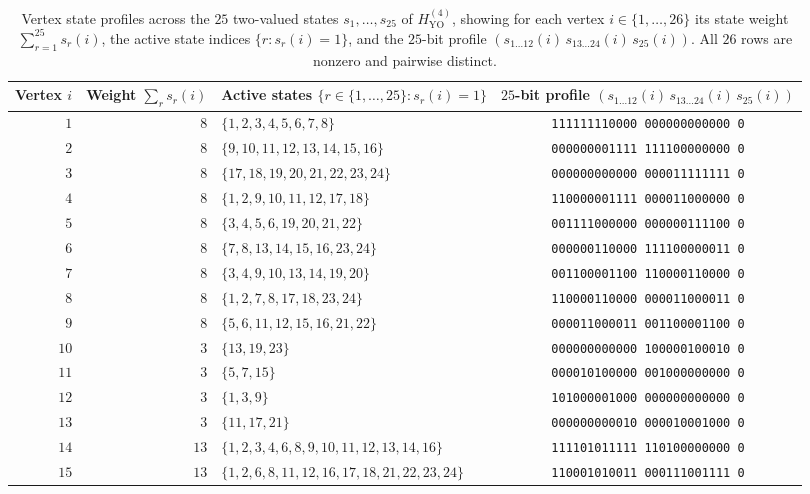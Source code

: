 \documentclass[
  aps,
  pra,
  reprint,
  superscriptaddress,
  amsmath,
  amssymb,
  nofootinbib,
  floatfix
]{revtex4-2}
\theoremstyle{definition}
\theoremstyle{remark}
\newcommand{\YO}{\mathrm{YO}}
\begin{document}
\begin{table}[t]
\caption{Vertex state profiles across the $25$ two-valued states $s_1,\ldots,s_{25}$ of $H_{\YO}^{(4)}$, showing for each vertex $i\in\{1,\ldots,26\}$ its state weight $\sum_{r=1}^{25}s_r(i)$, the active state indices $\{r : s_r(i)=1\}$, and the $25$-bit profile $(s_{1\ldots 12}(i)\,s_{13\ldots 24}(i)\,s_{25}(i))$. All $26$ rows are nonzero and pairwise distinct.}\label{tab:app-hyo4-profiles}
\scriptsize
\begin{ruledtabular}
\begin{tabular}{rrlc}
Vertex $i$ & Weight $\sum_r s_r(i)$ & Active states $\{r\in\{1,\ldots,25\} : s_r(i)=1\}$ & $25$-bit profile $(s_{1\ldots 12}(i)\,s_{13\ldots 24}(i)\,s_{25}(i))$ \\ \hline
$1$ & $8$ & $\{1,2,3,4,5,6,7,8\}$ & \texttt{111111110000\,000000000000\,0} \\
$2$ & $8$ & $\{9,10,11,12,13,14,15,16\}$ & \texttt{000000001111\,111100000000\,0} \\
$3$ & $8$ & $\{17,18,19,20,21,22,23,24\}$ & \texttt{000000000000\,000011111111\,0} \\
$4$ & $8$ & $\{1,2,9,10,11,12,17,18\}$ & \texttt{110000001111\,000011000000\,0} \\
$5$ & $8$ & $\{3,4,5,6,19,20,21,22\}$ & \texttt{001111000000\,000000111100\,0} \\
$6$ & $8$ & $\{7,8,13,14,15,16,23,24\}$ & \texttt{000000110000\,111100000011\,0} \\
$7$ & $8$ & $\{3,4,9,10,13,14,19,20\}$ & \texttt{001100001100\,110000110000\,0} \\
$8$ & $8$ & $\{1,2,7,8,17,18,23,24\}$ & \texttt{110000110000\,000011000011\,0} \\
$9$ & $8$ & $\{5,6,11,12,15,16,21,22\}$ & \texttt{000011000011\,001100001100\,0} \\ \hline
$10$ & $3$ & $\{13,19,23\}$ & \texttt{000000000000\,100000100010\,0} \\
$11$ & $3$ & $\{5,7,15\}$ & \texttt{000010100000\,001000000000\,0} \\
$12$ & $3$ & $\{1,3,9\}$ & \texttt{101000001000\,000000000000\,0} \\
$13$ & $3$ & $\{11,17,21\}$ & \texttt{000000000010\,000010001000\,0} \\ \hline
$14$ & $13$ & $\{1,2,3,4,6,8,9,10,11,12,13,14,16\}$ & \texttt{111101011111\,110100000000\,0} \\
$15$ & $13$ & $\{1,2,6,8,11,12,16,17,18,21,22,23,24\}$ & \texttt{110001010011\,000111001111\,0} \\

\end{tabular}
\end{ruledtabular}
\end{table}
\end{document}
